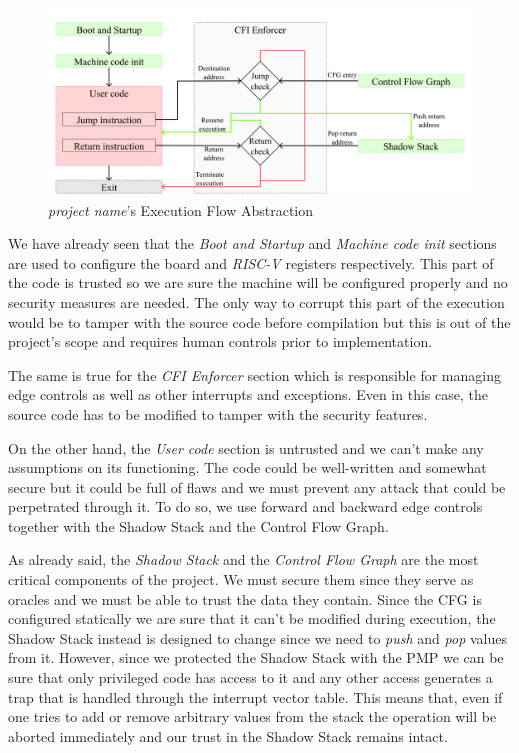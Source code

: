 \begin{figure}[htbp]
  \centering
  \includegraphics[width=.9\linewidth]{images/functioning.png}
  \caption{\textit{project name}'s Execution Flow Abstraction}
  \label{fig:functioning}
\end{figure}

We have already seen that the \textit{Boot and Startup} and \textit{Machine code
init} sections are used to configure the board and \textit{RISC-V} registers respectively.
This part of the code is trusted so we are sure the machine will be configured
properly and no security measures are needed. The only way to corrupt this part of
the execution would be to tamper with the source code before compilation but this
is out of the project's scope and requires human controls prior to implementation.

The same is true for the \textit{CFI Enforcer} section which is responsible for
managing edge controls as well as other interrupts and exceptions. Even in this case,
the source code has to be modified to tamper with the security features.

On the other hand, the \textit{User code} section is untrusted and we can't make
any assumptions on its functioning. The code could be well-written and somewhat secure
but it could be full of flaws and we must prevent any attack that could be perpetrated
through it. To do so, we use forward and backward edge controls together with the
Shadow Stack and the Control Flow Graph.

As already said, the \textit{Shadow Stack} and the \textit{Control Flow Graph}
are the most critical components of the project. We must secure them since they serve
as oracles and we must be able to trust the data they contain. Since the CFG is
configured statically we are sure that it can't be modified during execution, the
Shadow Stack instead is designed to change since we need to \textit{push} and
\textit{pop} values from it. However, since we protected the Shadow Stack with the
PMP we can be sure that only privileged code has access to it and any other access
generates a trap that is handled through the interrupt vector table. This means
that, even if one tries to add or remove arbitrary values from the stack the operation
will be aborted immediately and our trust in the Shadow Stack remains intact.

